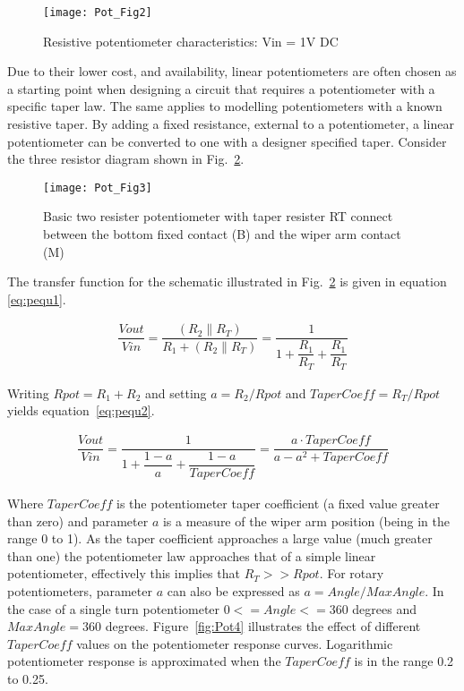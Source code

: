 \begin{figure} [here]
  \centering
  \texttt{[image: Pot\_Fig2]}
  \caption{Resistive potentiometer characteristics: Vin = 1V DC}
  \label{fig:Pot2}
\end{figure} 


Due to their lower cost, and availability, linear potentiometers are
often chosen as a starting point when designing a circuit that
requires a potentiometer with a specific taper law. The same applies
to modelling potentiometers with a known resistive taper. By adding a
fixed resistance, external to a potentiometer, a linear potentiometer
can be converted to one with a designer specified taper. Consider the
three resistor diagram shown in Fig.~\ref{fig:Pot3}.

\begin{figure} [here]
  \centering
  \texttt{[image: Pot\_Fig3]}
  \caption{Basic two resister potentiometer with taper resister RT connect between the bottom fixed contact (B) and the wiper arm contact (M)}
  \label{fig:Pot3} 
\end{figure} 

The transfer function for the schematic illustrated in
Fig.~\ref{fig:Pot3} is given in equation \eqref{eq:pequ1}.

\begin{align}
\label{eq:pequ1}
\dfrac{Vout}{Vin}=\dfrac{\left( R_{2} \parallel R_{T} \right) }{R_{1}+\left( R_{2} \parallel R_{T} \right) }
                 =\dfrac{1}{1+\dfrac{R_{1}}{R_{T}}+\dfrac{R_{1}}{R_{T}}}
\end{align}  

Writing $Rpot=R_{1}+R_{2}$ and setting $a=R_{2}/Rpot$ and
$TaperCoeff=R_{T}/Rpot$ yields equation~\eqref{eq:pequ2}.

\begin{align}
\label{eq:pequ2}
\dfrac{Vout}{Vin}=\dfrac{1}{1+\dfrac{1-a}{a}+\dfrac{1-a}{TaperCoeff}}=\dfrac{a \cdot TaperCoeff}{a - a^{2} +TaperCoeff}
\end{align}  

Where $TaperCoeff$ is the potentiometer taper coefficient (a fixed
value greater than zero) and parameter $a$ is a measure of the wiper
arm position (being in the range 0 to 1). As the taper coefficient
approaches a large value (much greater than one) the potentiometer law
approaches that of a simple linear potentiometer, effectively this
implies that $R_{T}>>Rpot$.  For rotary potentiometers, parameter $a$
can also be expressed as $a=Angle/MaxAngle$. In the case of a single
turn potentiometer $0 <= Angle <= 360$ degrees and $MaxAngle = 360$
degrees.  Figure~\ref{fig:Pot4} illustrates the effect of different
$TaperCoeff$ values on the potentiometer response curves.  Logarithmic
potentiometer response is approximated when the $TaperCoeff$ is in the
range 0.2 to 0.25.


